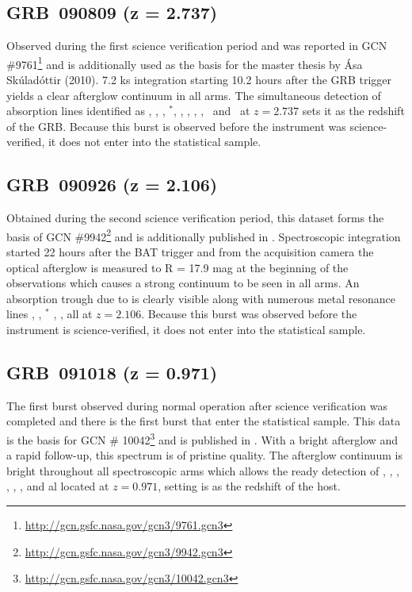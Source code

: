 \documentclass{aa}    %
\begin{document}
\subsection{GRB~090809 (z = 2.737)} Observed during the first science
verification period and was reported in GCN
\#9761\footnote{\url{http://gcn.gsfc.nasa.gov/gcn3/9761.gcn3}} and is
additionally used as the basis for the master thesis by \'Asa Sk\'ulad\'ottir
(2010). 7.2 ks integration starting 10.2 hours after the GRB trigger yields a
clear afterglow continuum in all arms. The simultaneous detection of absorption
lines identified as \lya, \SIii, \oi, \SIi$^*$, \SIiv, \civ, \feii, \alii,
\aliii~and \mgii~at $z = 2.737$ sets it as the redshift of the GRB. Because this
burst is observed before the instrument was science-verified, it does not enter
into the statistical sample.

\subsection{GRB~090926 (z = 2.106)} Obtained during the second science
verification period, this dataset forms the basis of GCN
\#9942\footnote{\url{http://gcn.gsfc.nasa.gov/gcn3/9942.gcn3}} and is
additionally published in \citet{DElia2010}. Spectroscopic integration started
22 hours after the BAT trigger and from the acquisition camera the optical
afterglow is measured to R = 17.9 mag at the beginning of the observations which
causes a strong continuum to be seen in all arms. An absorption trough due to
\lya is clearly visible along with numerous metal resonance lines \civ, \SIii,
\SIii$^*$ \feii, \mgii, all at $z = 2.106$. Because this burst was observed
before the instrument is science-verified, it does not enter into the
statistical sample.

\subsection{GRB~091018 (z = 0.971)}
The first burst observed during normal operation after science verification was
completed and there is the first burst that enter the statistical sample. This
data is the basis for GCN \#
10042\footnote{\url{http://gcn.gsfc.nasa.gov/gcn3/10042.gcn3}} and is published
in \citet{Wiersema2012}. With a bright afterglow and a rapid follow-up, this
spectrum is of pristine quality. The afterglow continuum is bright throughout
all spectroscopic arms which allows the ready detection of \alii, \aliii, \feii,
\mnii, \mgii, \mgi, and \caii al located at $z = 0.971$, setting is as the
redshift of the host.
\end{document}
